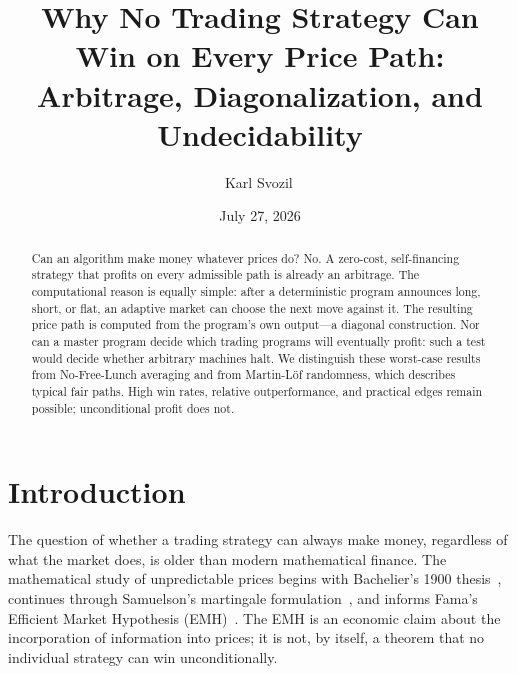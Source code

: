 \documentclass[aps,pra,reprint,superscriptaddress,amsmath,amssymb,floatfix]{revtex4-2}
\theoremstyle{plain}
\theoremstyle{definition}
\theoremstyle{remark}
\begin{document}
\title{Why No Trading Strategy Can Win on Every Price Path:
Arbitrage, Diagonalization, and Undecidability}

\author{Karl Svozil\,}

\date{July 27, 2026}

\begin{abstract}
Can an algorithm make money whatever prices do? No. A zero-cost,
self-financing strategy that profits on every admissible path is already an
arbitrage. The computational reason is equally simple: after a deterministic
program announces long, short, or flat, an adaptive market can choose the next
move against it. The resulting price path is computed from the program's own
output---a diagonal construction. Nor can a master program decide which
trading programs will eventually profit: such a test would decide whether
arbitrary machines halt. We distinguish these worst-case results from
No-Free-Lunch averaging and from Martin-L\"of randomness, which describes
typical fair paths. High win rates, relative outperformance, and practical
edges remain possible; unconditional profit does not.
\end{abstract}

\maketitle

\section{Introduction}
\label{sec:intro}

The question of whether a trading strategy can always make money, regardless
of what the market does, is older than modern mathematical finance. The
mathematical study of unpredictable prices begins with Bachelier's 1900
thesis~\cite{Bachelier1900}, continues through Samuelson's martingale
formulation~\cite{Samuelson1965}, and informs Fama's Efficient Market
Hypothesis (EMH)~\cite{Fama1970}. The EMH is an economic claim about the
incorporation of information into prices; it is not, by itself, a theorem that
no individual strategy can win unconditionally.
\end{document}
